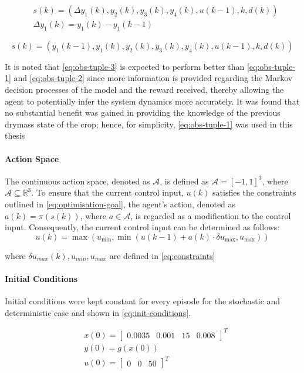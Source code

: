 \begin{equation}\label{eq:obs-tuple-2}
\begin{aligned}
    & s(k) = (\Delta y_1(k),y_2(k),y_3(k),y_4(k), u(k-1), k, d(k)) \\
    & \Delta y_1(k) = y_1(k) - y_1(k-1)
\end{aligned}
\end{equation}


\begin{equation}\label{eq:obs-tuple-3}
    s(k) = (y_1(k-1),y_1(k),y_2(k),y_3(k),y_4(k), u(k-1), k, d(k))
\end{equation}

It is noted that \autoref{eq:obs-tuple-3} is expected to perform better than \autoref{eq:obs-tuple-1} and \autoref{eq:obs-tuple-2} since more information is provided regarding the Markov decision processes of the model and the reward received, thereby allowing the agent to potentially infer the system dynamics more accurately. It was found that no substantial benefit was gained in providing the knowledge of the previous drymass state of the crop; hence, for simplicity, \autoref{eq:obs-tuple-1} was used in this thesis

\paragraph{Action Space}
The continuous action space, denoted as \( \mathcal{A} \), is defined as \( \mathcal{A} = [-1, 1]^3 \), where \( \mathcal{A} \subseteq \mathbb{R}^3 \). To ensure that the current control input, $u(k)$ satisfies the constraints outlined in \autoref{eq:optimisation-goal}, the agent’s action, denoted as  $a(k) = \pi (s(k))$, where $a \in \mathcal{A}$, is regarded as a modification to the control input. Consequently, the current control input can be determined as follows:
$$
u(k) = \max(u_{\min}, \min(u(k-1) + a(k) \cdot \delta u_{\max}, u_{\max}))
$$

where $\delta u_{max}(k),u_{min}, u_{max}$ are defined in \autoref{eq:constraints}

\paragraph{Initial Conditions}
Initial conditions were kept constant for every episode for the stochastic and deterministic case and shown in \autoref{eq:init-conditions}.

\begin{equation}
    \label{eq:init-conditions}
    \begin{aligned}
        &x(0) = \begin{bmatrix}
            0.0035&0.001&15&0.008
        \end{bmatrix}^T \\
        &y(0) = g(x(0)) \\
        &u(0) = \begin{bmatrix}
            0 & 0 & 50
        \end{bmatrix}^T
    \end{aligned}
\end{equation}

